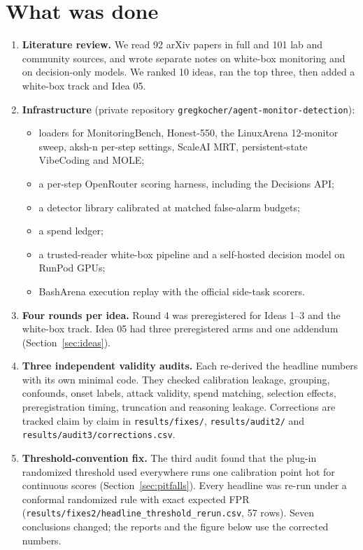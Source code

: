 \documentclass[11pt]{article}
\begin{document}
\tableofcontents

\section{What was done}
\begin{enumerate}
\item \textbf{Literature review.} We read 92 arXiv papers in full and 101 lab and community sources, and wrote separate notes on white-box monitoring and on decision-only models. We ranked 10 ideas, ran the top three, then added a white-box track and Idea 05.
\item \textbf{Infrastructure} (private repository \texttt{gregkocher/agent-monitor-detection}):
  \begin{itemize}
  \item loaders for MonitoringBench, Honest-550, the LinuxArena 12-monitor sweep, aksh-n per-step settings, ScaleAI MRT, persistent-state VibeCoding and MOLE;
  \item a per-step OpenRouter scoring harness, including the Decisions API;
  \item a detector library calibrated at matched false-alarm budgets;
  \item a spend ledger;
  \item a trusted-reader white-box pipeline and a self-hosted decision model on RunPod GPUs;
  \item BashArena execution replay with the official side-task scorers.
  \end{itemize}
\item \textbf{Four rounds per idea.} Round 4 was preregistered for Ideas 1--3 and the white-box track. Idea 05 had three preregistered arms and one addendum (Section~\ref{sec:ideas}).
\item \textbf{Three independent validity audits.} Each re-derived the headline numbers with its own minimal code. They checked calibration leakage, grouping, confounds, onset labels, attack validity, spend matching, selection effects, preregistration timing, truncation and reasoning leakage. Corrections are tracked claim by claim in \texttt{results/fixes/}, \texttt{results/audit2/} and \texttt{results/audit3/corrections.csv}.
\item \textbf{Threshold-convention fix.} The third audit found that the plug-in randomized threshold used everywhere runs one calibration point hot for continuous scores (Section~\ref{sec:pitfalls}). Every headline was re-run under a conformal randomized rule with exact expected FPR (\texttt{results/fixes2/headline\_threshold\_rerun.csv}, 57 rows). Seven conclusions changed; the reports and the figure below use the corrected numbers.
\end{enumerate}
\end{document}
